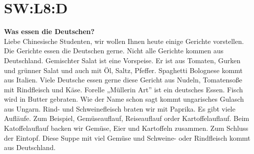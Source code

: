 \section{SW:L8:D}
\textbf{Was essen die Deutschen?} \\
Liebe Chinesische Studenten, wir wollen Ihnen heute einige Gerichte vorstellen.
Die Gerichte essen die Deutschen gerne. Nicht alle Gerichte kommen aus Deutschland.
Gemischter Salat ist eine Vorspeise. Er ist aus Tomaten, Gurken und grünner Salat und auch mit Öl, Saltz, Pfeffer.
Spaghetti Bolognese kommt aus Italien. Viele Deutsche essen gerne diese Gericht aus Nudeln, Tomatensoße mit Rindfleisch und Käse.
Forelle „Müllerin Art” ist ein deutsches Essen. Fisch wird in Butter gebraten. 
Wie der Name schon sagt kommt ungarisches Gulasch aus Ungarn. Rind- und Schweinefleisch braten wir mit Paprika.
Es gibt viele Aufläufe. Zum Beispiel, Gemüseauflauf, Reiseauflauf order Kartoffelauflauf.
Beim Katoffelauflauf backen wir Gemüse, Eier und Kartoffeln zusammen. 
Zum Schluss der Eintopf.  Diese Suppe mit viel Gemüse und Schweine- oder Rindfleisch kommt aus Deutschland.

